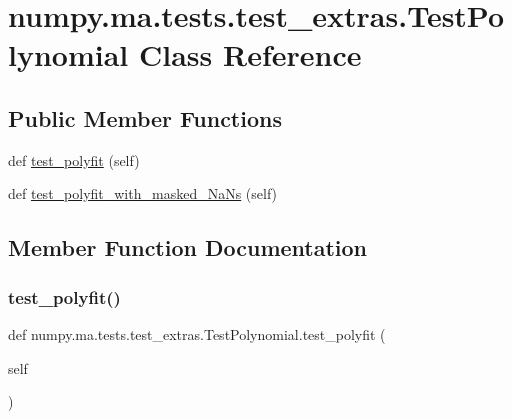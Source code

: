 \hypertarget{classnumpy_1_1ma_1_1tests_1_1test__extras_1_1TestPolynomial}{}\section{numpy.\+ma.\+tests.\+test\+\_\+extras.\+Test\+Polynomial Class Reference}
\label{classnumpy_1_1ma_1_1tests_1_1test__extras_1_1TestPolynomial}
\subsection*{Public Member Functions}
\begin{DoxyCompactItemize}
\item 
def \hyperlink{classnumpy_1_1ma_1_1tests_1_1test__extras_1_1TestPolynomial_a3dff3f2e315255b7a4bfb9f94813f18b}{test\+\_\+polyfit} (self)
\item 
def \hyperlink{classnumpy_1_1ma_1_1tests_1_1test__extras_1_1TestPolynomial_a635c9117bd796560dabb57b4eec9e067}{test\+\_\+polyfit\+\_\+with\+\_\+masked\+\_\+\+Na\+Ns} (self)
\end{DoxyCompactItemize}


\subsection{Member Function Documentation}
\mbox{\label{classnumpy_1_1ma_1_1tests_1_1test__extras_1_1TestPolynomial_a3dff3f2e315255b7a4bfb9f94813f18b}} 
\subsubsection{\texorpdfstring{test\+\_\+polyfit()}{test\_polyfit()}}
{\footnotesize\ttfamily def numpy.\+ma.\+tests.\+test\+\_\+extras.\+Test\+Polynomial.\+test\+\_\+polyfit (\begin{DoxyParamCaption}\item[{}]{self }\end{DoxyParamCaption})}

